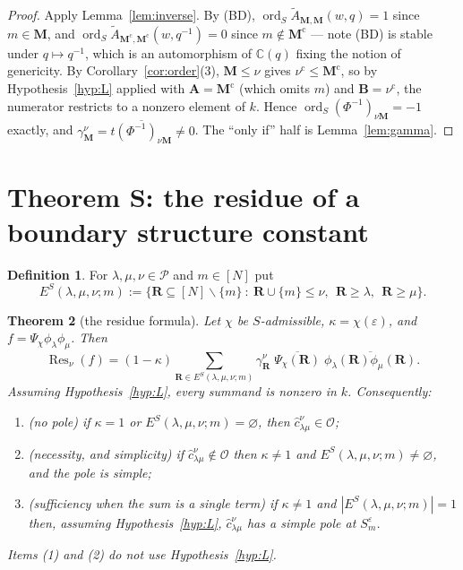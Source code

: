 \documentclass[11pt]{article}
\newtheorem{thm}{Theorem}
\theoremstyle{definition}
\newtheorem{defn}[thm]{Definition}
\newcommand{\At}{\widetilde{A}}
\newcommand{\bM}{\mathbf{M}}
\newcommand{\bA}{\mathbf{A}}
\newcommand{\bB}{\mathbf{B}}
\newcommand{\bR}{\mathbf{R}}
\newcommand{\sm}{\smallsetminus}
\newcommand{\ord}{\operatorname{ord}}
\newcommand{\ES}{E^{S}}
\begin{document}
\begin{proof}
Apply Lemma~\ref{lem:inverse}.  By (BD), $\ord_S\At_{\bM,\bM}(w,q)=1$ since
$m\in\bM$, and $\ord_S\At_{\bM^{\mathrm c},\bM^{\mathrm c}}(w,q^{-1})=0$ since
$m\notin\bM^{\mathrm c}$ --- note (BD) is stable under $q\mapsto q^{-1}$, which is
an automorphism of $\mathbb{C}(q)$ fixing the notion of genericity.  By
Corollary~\ref{cor:order}(3), $\bM\le\nu$ gives
$\nu^{\mathrm c}\le\bM^{\mathrm c}$, so by Hypothesis~\ref{hyp:L} applied with
$\bA=\bM^{\mathrm c}$ (which omits $m$) and $\bB=\nu^{\mathrm c}$, the numerator
restricts to a nonzero element of $k$.  Hence
$\ord_S(\Phi^{-1})_{\nu\bM}=-1$ exactly, and
$\gamma^{\nu}_{\bM}=\overline{t(\Phi^{-1})_{\nu\bM}}\ne0$.  The ``only if'' half
is Lemma~\ref{lem:gamma}.
\end{proof}

\section{Theorem S: the residue of a boundary structure constant}
\label{sec:S}

\begin{defn}\label{def:ES}
For $\lambda,\mu,\nu\in\mathcal{P}$ and $m\in[N]$ put
\[
  \ES(\lambda,\mu,\nu;m)
  :=\bigl\{\bR\subseteq[N]\sm\{m\}\ :\
      \bR\cup\{m\}\le\nu,\ \ \bR\ge\lambda,\ \ \bR\ge\mu\bigr\}.
\]
\end{defn}

\begin{thm}[the residue formula]\label{thm:S}
Let $\chi$ be $S$-admissible, $\kappa=\chi(\varepsilon)$, and
$f=\Psi_\chi\phi_\lambda\phi_\mu$.  Then
\[
  \operatorname{Res}_\nu(f)
  =(1-\kappa)\sum_{\bR\in \ES(\lambda,\mu,\nu;m)}
     \gamma^{\nu}_{\bR}\;
     \overline{\Psi_\chi(\bR)}\;\overline{\phi_\lambda(\bR)\phi_\mu(\bR)} .
\]
Assuming Hypothesis~\ref{hyp:L}, every summand is nonzero in $k$.
Consequently:
\begin{enumerate}
\item \textup{(no pole)} if $\kappa=1$ or $\ES(\lambda,\mu,\nu;m)=\varnothing$,
      then $\hat c^{\nu}_{\lambda\mu}\in\mathcal{O}$;
\item \textup{(necessity, and simplicity)} if $\hat c^{\nu}_{\lambda\mu}\notin\mathcal{O}$
      then $\kappa\ne1$ and $\ES(\lambda,\mu,\nu;m)\ne\varnothing$, and the pole is
      simple;
\item \textup{(sufficiency when the sum is a single term)} if $\kappa\ne1$ and
      $|\ES(\lambda,\mu,\nu;m)|=1$ then, assuming Hypothesis~\ref{hyp:L},
      $\hat c^{\nu}_{\lambda\mu}$ has a simple pole at $S_m^{\varepsilon}$.
\end{enumerate}
Items (1) and (2) do not use Hypothesis~\ref{hyp:L}.
\end{thm}
\end{document}
